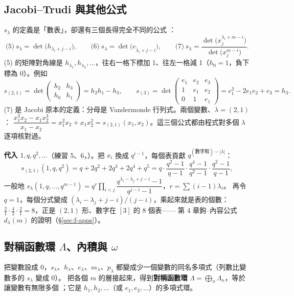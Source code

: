 \subsection{Jacobi–Trudi 與其他公式}\label{sec:f-jt}

$s_\lambda$ 的定義是「數表」，卻還有三個長得完全不同的公式 ：
\[
\text{(5)}\ s_\lambda=\det\bigl(h_{\lambda_i+j-i}\bigr),\qquad
\text{(6)}\ s_\lambda=\det\bigl(e_{\tilde\lambda_i+j-i}\bigr),\qquad
\text{(7)}\ s_\lambda=\frac{\det\bigl(x_j^{\lambda_i+m-i}\bigr)}{\det\bigl(x_j^{m-i}\bigr)} .
\]
(5) 的矩陣對角線是 $h_{\lambda_1},h_{\lambda_2},\ldots$，往右一格下標加 1、往左一格減 1（$h_0=1$，負下標為 0）。例如
\[
s_{(2,1)}=\det\begin{pmatrix}h_2&h_3\\ h_0&h_1\end{pmatrix}=h_2h_1-h_3 ,\qquad
s_{(3)}=\det\begin{pmatrix}e_1&e_2&e_3\\ 1&e_1&e_2\\ 0&1&e_1\end{pmatrix}=e_1^3-2e_1e_2+e_3=h_3 .
\]
(7) 是 Jacobi 原本的定義：分母是 Vandermonde 行列式。兩個變數、$\lambda=(2,1)$：
$\dfrac{x_1^3x_2-x_1x_2^3}{x_1-x_2}=x_1^2x_2+x_1x_2^2=s_{(2,1)}(x_1,x_2)$。這三個公式都由程式對多個 $\lambda$ 逐項核對過。

\textbf{代入 $1,q,q^2,\ldots$}（練習 5、6，）。把 $x_i$ 換成 $q^{i-1}$，每個表貢獻 $q^{(\text{數字和})-|\lambda|}$：
\[
s_{(2,1)}(1,q,q^2)=q+2q^2+2q^3+2q^4+q^5=q\cdot\frac{q^2-1}{q-1}\cdot\frac{q^4-1}{q^2-1}\cdot\frac{q^2-1}{q-1},
\]
一般地 $s_\lambda(1,q,\ldots,q^{m-1})=q^{r}\prod_{i<j}\dfrac{q^{\lambda_i-\lambda_j+j-i}-1}{q^{j-i}-1}$，$r=\sum(i-1)\lambda_i$。
再令 $q=1$，每個分式變成 $(\lambda_i-\lambda_j+j-i)/(j-i)$，乘起來就是表的個數：$\tfrac21\cdot\tfrac42\cdot\tfrac21=8$，正是 $(2,1)$ 形、數字在 $[3]$ 的 8 個表——
第 4 章鉤–內容公式 $d_\lambda(m)$ 的證明（\S\ref{sec:f-apps}）。

\subsection{對稱函數環 $\Lambda$、內積與 $\omega$}\label{sec:f-lambda}

把變數設成 0，$s_\lambda$、$h_\lambda$、$e_\lambda$、$m_\lambda$、$p_\lambda$ 都變成少一個變數的同名多項式（列數比變數多的 $s_\lambda$ 變成 0）。
把各個 $m$ 的層接起來，得到\textbf{對稱函數環} $\Lambda=\bigoplus_n\Lambda_n$，等於讓變數有無限多個 ；它是 $h_1,h_2,\ldots$（或 $e_1,e_2,\ldots$）的多項式環。

